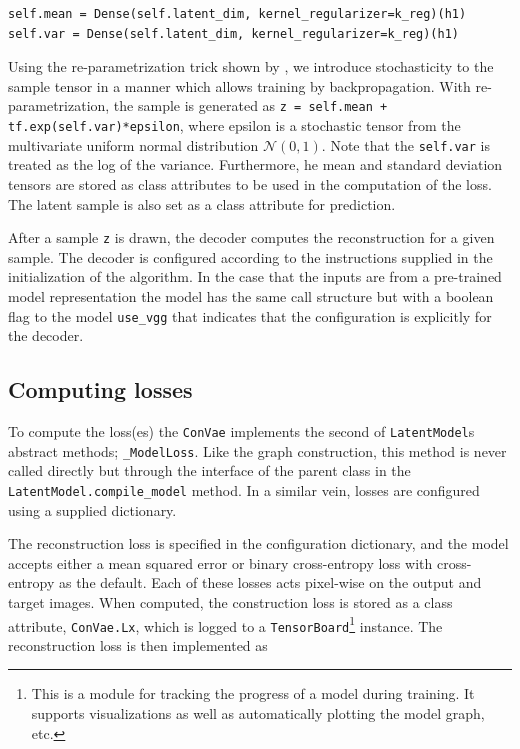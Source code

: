 \begin{lstlisting}[language=iPython]
self.mean = Dense(self.latent_dim, kernel_regularizer=k_reg)(h1)
self.var = Dense(self.latent_dim, kernel_regularizer=k_reg)(h1)
\end{lstlisting}

 Using the re-parametrization trick shown by \citet{Kingma2013}, we introduce stochasticity to the sample tensor in a manner which allows training by backpropagation. With re-parametrization, the sample is generated as \lstinline{z = self.mean + tf.exp(self.var)*epsilon}, where epsilon is a stochastic tensor from the multivariate uniform normal distribution $\mathcal{N}(0, 1)$. Note that the \lstinline{self.var} is treated as the log of the variance. Furthermore, he mean and standard deviation tensors are stored as class attributes to be used in the computation of the loss. The latent sample is also set as a class attribute for prediction.

After a sample \lstinline{z} is drawn, the decoder computes the reconstruction for a given sample. The decoder is configured according to the instructions supplied in the initialization of the algorithm. In the case that the inputs are from a pre-trained model representation the model has the same call structure but with a boolean flag to the model \lstinline{use_vgg} that indicates that the configuration is explicitly for the decoder. 

\subsection{Computing losses}

To compute the loss(es) the \lstinline{ConVae} implements the second of \lstinline{LatentModel}s abstract methods; \lstinline{_ModelLoss}. Like the graph construction, this method is never called directly but through the interface of the parent class in the \lstinline{LatentModel.compile_model} method.  In a similar vein, losses are configured using a supplied dictionary.

The reconstruction loss is specified in the configuration dictionary, and the model accepts either a mean squared error or binary cross-entropy loss with cross-entropy as the default. Each of these losses acts pixel-wise on the output and target images. When computed, the construction loss is stored as a class attribute, \lstinline{ConVae.Lx}, which is logged to a \lstinline{TensorBoard}\footnote{This is a module for tracking the progress of a model during training. It supports visualizations as well as automatically plotting the model graph, etc.} instance. The reconstruction loss is then implemented as


